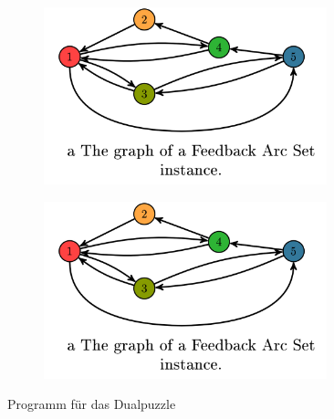 \documentclass[seminar,german]{algothesis}
\begin{document}
\begin{figure}[ht]
	\centering
	\begin{subfigure}{.4\textwidth}
		\includegraphics[width=0.9\textwidth]{graph}
    \end{subfigure}%
    \begin{subfigure}{.4\textwidth}
		\includegraphics[width=0.9\textwidth]{graph}
    \end{subfigure}
    \caption{Programm für das Dualpuzzle}
	\label{fig:6}
\end{figure}





\clearpage
\nocite{*}
\printbibliography
\end{document}
